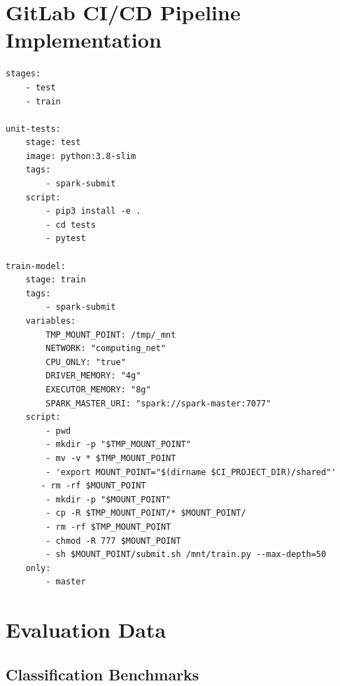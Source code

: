 \section{GitLab CI/CD Pipeline Implementation}

\begin{lstlisting}[label=lst:appendix_ci-pipeline_job, caption=texttt{.gitlab-ci.yml} configuration file]
stages:
    - test
    - train
 
unit-tests:
    stage: test
    image: python:3.8-slim
    tags:
        - spark-submit
    script:
        - pip3 install -e .
        - cd tests
        - pytest
 
train-model:
    stage: train
    tags:
        - spark-submit
    variables:
        TMP_MOUNT_POINT: /tmp/_mnt
        NETWORK: "computing_net"
        CPU_ONLY: "true"
        DRIVER_MEMORY: "4g"
        EXECUTOR_MEMORY: "8g"
        SPARK_MASTER_URI: "spark://spark-master:7077"
    script:
        - pwd
        - mkdir -p "$TMP_MOUNT_POINT"
        - mv -v * $TMP_MOUNT_POINT
        - 'export MOUNT_POINT="$(dirname $CI_PROJECT_DIR)/shared"'
       - rm -rf $MOUNT_POINT
        - mkdir -p "$MOUNT_POINT"
        - cp -R $TMP_MOUNT_POINT/* $MOUNT_POINT/
        - rm -rf $TMP_MOUNT_POINT
        - chmod -R 777 $MOUNT_POINT
        - sh $MOUNT_POINT/submit.sh /mnt/train.py --max-depth=50
    only:
        - master
\end{lstlisting}


\section{Evaluation Data}
\label{sec:appendix_eval}

\subsection{Classification Benchmarks}
\label{sec:appendix_eval_classification}


